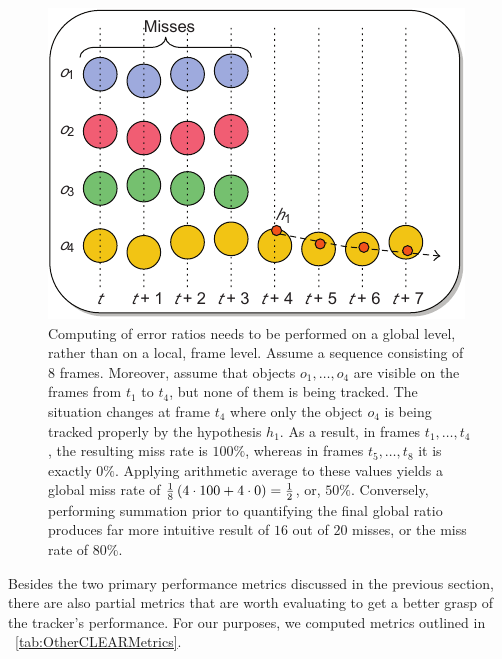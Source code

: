 \begin{figure}[t]
    \centerline{\includegraphics[width=0.5\linewidth]{figures/theoretical_foundations/local_vs_global_ratio_evaluation.pdf}}
    \caption[Local vs. global ratio evaluation]{Computing of error ratios needs to be performed on a global level, rather than on a local, frame level. Assume a sequence consisting of $8$ frames. Moreover, assume that objects $o_1, \dots, o_4$ are visible on the frames from $t_1$ to $t_4$, but none of them is being tracked. The situation changes at frame $t_4$ where only the object $o_4$ is being tracked properly by the hypothesis $h_1$. As a result, in frames $t_1, \dots, t_4$, the resulting miss rate is $100\%$, whereas in frames $t_5, \dots, t_8$ it is exactly $0\%$. Applying arithmetic average to these values yields a global miss rate of $\frac{1}{8} \left( {4 \cdot 100 + 4 \cdot 0} \right) = \frac{1}{2}$, or, $50\%$. Conversely, performing summation prior to quantifying the final global ratio produces far more intuitive result of $16$ out of $20$ misses, or the miss rate of $80\%$. }
    \label{fig:LocalGlobalRatioEval}
\end{figure}

Besides the two primary performance metrics discussed in the previous section, there are also partial metrics that are worth evaluating to get a better grasp of the tracker's performance. For our purposes, we computed metrics outlined in \tabletext{}~\ref{tab:OtherCLEARMetrics}.

